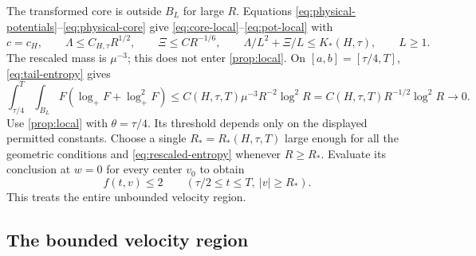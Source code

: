 The transformed core is outside $B_L$ for large $R$. Equations \eqref{eq:physical-potentials}--\eqref{eq:physical-core} give \eqref{eq:core-local}--\eqref{eq:pot-local} with
\[
 c=c_H,\qquad \Lambda\le C_{H,\tau}R^{1/2},\qquad
 \Xi\le CR^{-1/6},\qquad
 \Lambda/L^2+\Xi/L\le K_*(H,\tau),\qquad L\ge1.
\]
The rescaled mass is $\mu^{-3}$; this does not enter \cref{prop:local}. On $[a,b]=[\tau/4,T]$, \eqref{eq:tail-entropy} gives
\begin{equation}\label{eq:rescaled-entropy}
 \int_{\tau/4}^T\int_{B_L}F(\log_+F+\log_+^2F)
 \le C(H,\tau,T)\mu^{-3}R^{-2}\log^2R
 =C(H,\tau,T)R^{-1/2}\log^2R\longrightarrow0.
\end{equation}
Use \cref{prop:local} with $\theta=\tau/4$. Its threshold depends only on the displayed permitted constants. Choose a single $R_*=R_*(H,\tau,T)$ large enough for all the geometric conditions and \eqref{eq:rescaled-entropy} whenever $R\ge R_*$. Evaluate its conclusion at $w=0$ for every center $v_0$ to obtain
\begin{equation}\label{eq:tail-sup}
 f(t,v)\le2\qquad(\tau/2\le t\le T,\ |v|\ge R_*).
\end{equation}
This treats the entire unbounded velocity region.

\subsection{The bounded velocity region}

